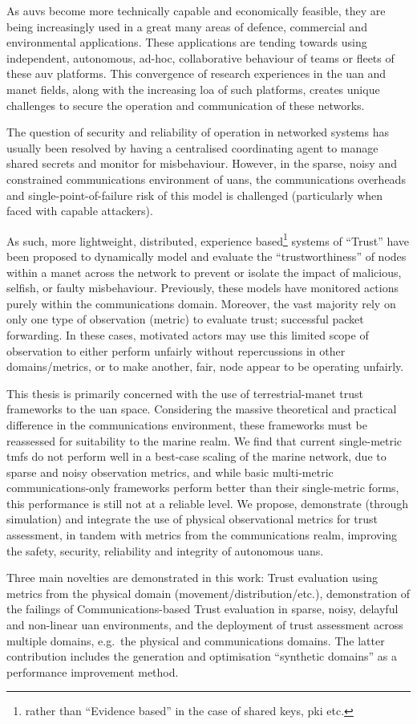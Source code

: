 As \glspl{auv} become more technically capable and economically feasible, they are being increasingly used in a great many areas of defence, commercial and environmental applications. 
These applications are tending towards using independent, autonomous, ad-hoc, collaborative behaviour of teams or fleets of these \gls{auv} platforms.
This convergence of research experiences in the \gls{uan} and \gls{manet} fields, along with the increasing \gls{loa} of such platforms, creates unique challenges to secure the operation and communication of these networks.

The question of security and reliability of operation in networked systems has usually been resolved by having a centralised coordinating agent to manage shared secrets and monitor for misbehaviour.
However, in the sparse, noisy and constrained communications environment of \glspl{uan}, the communications overheads and single-point-of-failure risk of this model is challenged (particularly when faced with capable attackers).

As such, more lightweight, distributed, experience based\footnote{rather than ``Evidence based'' in the case of shared keys, \gls{pki} etc.} systems of ``Trust'' have been proposed to dynamically model and evaluate the ``trustworthiness'' of nodes within a \gls{manet} across the network to prevent or isolate the impact of malicious, selfish, or faulty misbehaviour. 
Previously, these models have monitored actions purely within the communications domain. 
Moreover, the vast majority rely on only one type of observation (metric) to evaluate trust; successful packet forwarding.
In these cases, motivated actors may use this limited scope of observation to either perform unfairly without repercussions in other domains/metrics, or to make another, fair, node appear to be operating unfairly.

This thesis is primarily concerned with the use of terrestrial-\gls{manet} trust frameworks to the \gls{uan} space. 
Considering the massive theoretical and practical difference in the communications environment, these frameworks must be reassessed for suitability to the marine realm. 
We find that current single-metric \glspl{tmf} do not perform well in a best-case scaling of the marine network, due to sparse and noisy observation metrics, and while basic multi-metric communications-only frameworks perform better than their single-metric forms, this performance is still not at a reliable level. 
We propose, demonstrate (through simulation) and integrate the use of physical observational metrics for trust assessment, in tandem with metrics from the communications realm, improving the safety, security, reliability and integrity of autonomous \glspl{uan}.

Three main novelties are demonstrated in this work:
Trust evaluation using metrics from the physical domain (movement/distribution/etc.), demonstration of the failings of Communications-based Trust evaluation in sparse, noisy, delayful and non-linear \gls{uan} environments, and the deployment of trust assessment across multiple domains, e.g.\ the physical and communications domains.
The latter contribution includes the generation and optimisation ``synthetic domains'' as a performance improvement method.
